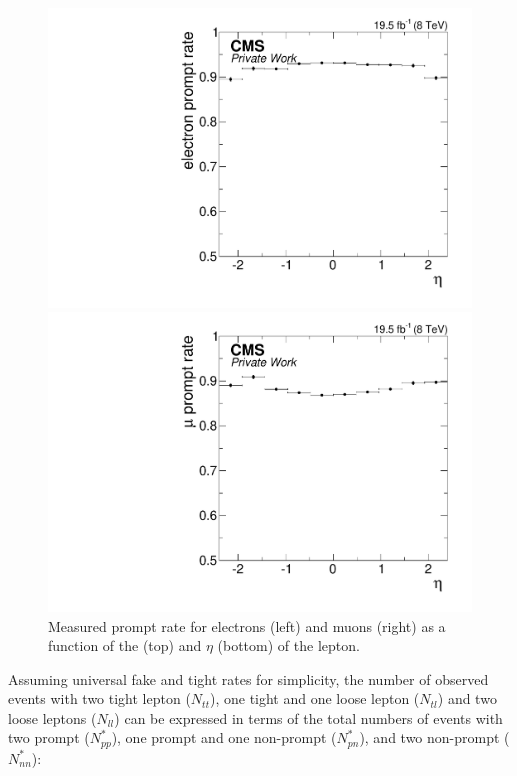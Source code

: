 \begin{figure}[tbp]
\begin{minipage}[t]{0.49\textwidth}
\includegraphics[width=\textwidth]{plots/BG/nonPrompt/promptRate_ele_Inclusive_Full2012_TrailingEta_None.pdf}
\end{minipage}
\begin{minipage}[t]{0.49\textwidth}
\includegraphics[width=\textwidth]{plots/BG/nonPrompt/promptRate_mu_Inclusive_Full2012_TrailingEta_None.pdf}
\end{minipage}
\caption{Measured prompt rate for electrons (left) and muons (right) as a function of the \pt (top) and $\eta$ (bottom) of the lepton.}


\label{fig:promptRate}
\end{figure} 
Assuming universal fake and tight rates for simplicity, the number of observed events with two tight lepton ($N_{tt}$), one tight and one loose lepton ($N_{tl}$) and two loose leptons ($N_{ll}$) can be expressed in terms of the total numbers of events with two prompt ($N_{pp}^{*}$), one prompt and one non-prompt ($N_{pn}^{*}$), and two non-prompt ($N_{nn}^{*}$): 
